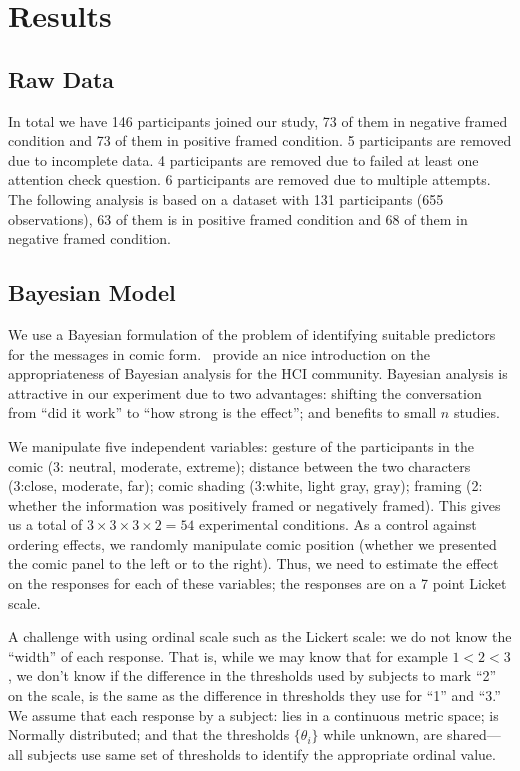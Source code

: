 
\section{Results}
\label{sec:Results}

\subsection{Raw Data}
\label{sub:Raw Data}
In total we have 146 participants joined our study, 73 of them in negative framed condition and 73 of them in positive framed condition. 5 participants are removed due to incomplete data. 4 participants are removed due to failed at least one attention check question. 6 participants are removed due to multiple attempts. The following analysis is based on a dataset with 131 participants (655 observations), 63 of them is in positive framed condition and 68 of them in negative framed condition.

\subsection{Bayesian Model}
\label{sub:Bayesian Model}
We use a Bayesian formulation of the problem of identifying suitable predictors for the messages in comic form.~\textcite{Kay2016} provide an nice introduction on the appropriateness of Bayesian analysis for the HCI community. Bayesian analysis is attractive in our experiment due to two advantages: shifting the conversation from ``did it work'' to ``how strong is the effect''; and benefits to small $n$ studies.

We manipulate five independent variables: gesture of the participants in the comic (3: neutral, moderate, extreme);  distance between the two characters (3:close, moderate, far); comic shading (3:white, light gray, gray); framing (2: whether the information was positively framed or negatively framed).  This gives us a total of $3 \times 3 \times 3 \times 2= 54$ experimental conditions. As a control against ordering effects, we randomly manipulate comic position (whether we presented the comic panel to the left or to the right).  Thus, we need to estimate the effect on the responses for each of these variables; the responses are on a 7 point Licket scale.

A challenge with using ordinal scale such as the Lickert scale: we do not know the ``width'' of each response. That is, while we may know that for example $1<2<3$, we don't know if the difference in the thresholds used by subjects to mark ``2'' on the scale, is the same as the difference in thresholds they use for ``1'' and ``3.''  We assume that each response by a subject: lies in a continuous metric space; is Normally distributed; and that the thresholds $\{\theta_i\}$ while unknown, are shared—all subjects use same set of thresholds to identify the appropriate ordinal value.

